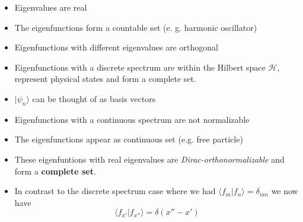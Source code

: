 \begin{itemize}
    \item Eigenvalues are real
    \item The eigenfunctions form a countable set (e. g. harmonic oscillator)
    \item Eigenfunctions with different eigenvalues are orthogonal
    \item Eigenfunctions with a discrete spectrum are within the Hilbert space $\mathcal{H}$, represent physical states and form a complete set.
    \item $|\psi_n\rangle$ can be thought of as basis vectors
\end{itemize}


\begin{itemize}
    \item Eigenfunctions with a continuous spectrum are not normalizable
    \item The eigenfunctions appear as continuous set (e.g. free particle)
    \item These eigenfuntions with real eigenvalues are \textit{Dirac-orthonormalizable} and form a \textbf{complete set}.
    \item In contrast to the discrete spectrum case where we had $\langle f_m|f_n\rangle=\delta_{mn}$ we now have
          \noindent\begin{equation*}
              \langle f_{x'}|f_{x''}\rangle=\delta(x''-x')
          \end{equation*}
\end{itemize}

